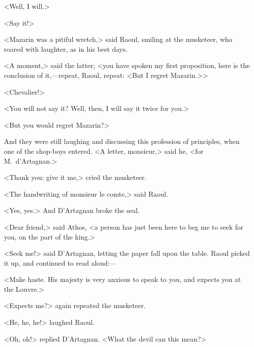 <Well, I will.>

<Say it!>

<Mazarin was a pitiful wretch,> said Raoul, smiling at the musketeer, who roared with laughter, as in his best days.

<A moment,> said the latter; <you have spoken my first proposition, here is the conclusion of it,—repeat, Raoul, repeat: <But I regret Mazarin.>>

<Chevalier!>

<You will not say it? Well, then, I will say it twice for you.>

<But you would regret Mazarin?>

And they were still laughing and discussing this profession of principles, when one of the shop-boys entered. <A letter, monsieur,> said he, <for M.~d'Artagnan.>

<Thank you; give it me,> cried the musketeer.

<The handwriting of monsieur le comte,> said Raoul.

<Yes, yes.> And D'Artagnan broke the seal.

<Dear friend,> said Athos, <a person has just been here to beg me to seek for you, on the part of the king.>

<Seek me!> said D'Artagnan, letting the paper fall upon the table. Raoul picked it up, and continued to read aloud:—

<Make haste. His majesty is very anxious to speak to you, and expects you at the Louvre.>

<Expects me?> again repeated the musketeer.

<He, he, he!> laughed Raoul.

<Oh, oh!> replied D'Artagnan. <What the devil can this mean?> 